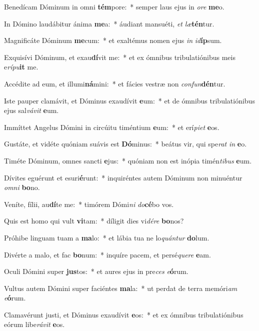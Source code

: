 \item Benedícam Dóminum in omni \textbf{tém}pore:~* semper laus ejus in \textit{o}\textit{re} \textbf{me}o.
\item In Dómino laudábitur ánima \textbf{me}a:~* áudiant mansuéti, \textit{et} \textit{læ}\textbf{tén}tur.
\item Magnificáte Dóminum \textbf{me}cum:~* et exaltémus nomen ejus \textit{in} \textit{id}\textbf{íp}sum.
\item Exquisívi Dóminum, et exau\textbf{dí}vit me:~* et ex ómnibus tribulatiónibus meis e\textit{rí}\textit{pu}\textbf{it} me.
\item Accédite ad eum, et illumi\textbf{ná}mini:~* et fácies vestræ non \textit{con}\textit{fun}\textbf{dén}tur.
\item Iste pauper clamávit, et Dóminus exaudívit \textbf{e}um:~* et de ómnibus tribulatiónibus ejus sal\textit{vá}\textit{vit} \textbf{e}um.
\item Immíttet Angelus Dómini in circúitu timéntium \textbf{e}um:~* et erí\textit{pi}\textit{et} \textbf{e}os.
\item Gustáte, et vidéte quóniam suávis est \textbf{Dó}minus:~* beátus vir, qui spe\textit{rat} \textit{in} \textbf{e}o.
\item Timéte Dóminum, omnes sancti \textbf{e}jus:~* quóniam non est inópia timén\textit{ti}\textit{bus} \textbf{e}um.
\item Dívites eguérunt et esuri\textbf{é}\-runt:~* inquiréntes autem Dóminum non minuéntur \textit{om}\textit{ni} \textbf{bo}no.
\item Veníte, fílii, au\textbf{dí}te me:~* timórem Dómi\textit{ni} \textit{do}\textbf{cé}bo vos.
\item Quis est homo qui vult \textbf{vi}tam:~* díligit dies vi\textit{dé}\textit{re} \textbf{bo}nos?
\item Próhibe linguam tuam a \textbf{ma}lo:~* et lábia tua ne lo\textit{quán}\textit{tur} \textbf{do}lum.
\item Divérte a malo, et fac \textbf{bo}num:~* inquíre pacem, et persé\textit{que}\textit{re} \textbf{e}am.
\item Oculi Dómini super \textbf{jus}tos:~* et aures ejus in pre\textit{ces} \textit{e}\textbf{ó}rum.
\item Vultus autem Dómini super faciéntes \textbf{ma}la:~* ut perdat de terra memóri\textit{am} \textit{e}\textbf{ó}rum.
\item Clamavérunt justi, et Dóminus exaudívit \textbf{e}os:~* et ex ómnibus tribulatiónibus eórum libe\textit{rá}\textit{vit} \textbf{e}os.
